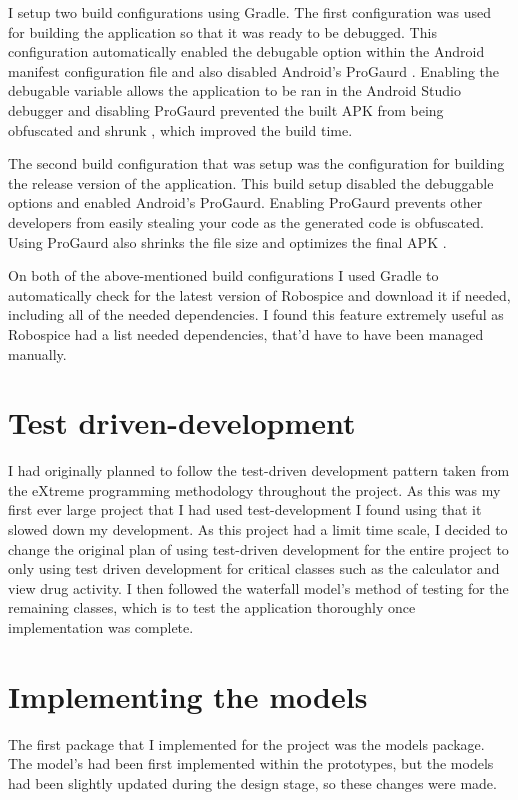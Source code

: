 I setup two build configurations using Gradle. The first configuration was used for building the application so that it was ready to be debugged. This configuration automatically enabled the debugable option within the Android manifest configuration file and also disabled Android’s ProGaurd \cite{progaurd}. Enabling the debugable variable allows the application to be ran in the Android Studio debugger and disabling ProGaurd prevented the built APK from being obfuscated and shrunk \cite{progaurd}, which improved the build time. 

The second build configuration that was setup was the configuration for building the release version of the application. This build setup disabled the debuggable options and enabled Android’s ProGaurd. Enabling ProGaurd prevents other developers from easily stealing your code as the generated code is obfuscated. Using ProGaurd also shrinks the file size and optimizes the final APK \cite{progaurd}.

On both of the above-mentioned build configurations I used Gradle to automatically check for the latest version of Robospice and download it if needed, including all of the needed dependencies. I found this feature extremely useful as Robospice had a list needed dependencies, that’d have to have been managed manually. 

\section{Test driven-development}

I had originally planned to follow the test-driven development pattern \cite{tdd} taken from the eXtreme programming \cite{xp} methodology throughout the project. As this was my first ever large project that I had used test-development I found using that it slowed down my development. As this project had a limit time scale, I decided to change the original plan of using test-driven development for the entire project to only using test driven development for critical classes such as the calculator and view drug activity. I then followed the waterfall model’s method of testing for the remaining classes, which is to test the application thoroughly once implementation was complete.

\section{Implementing the models}

The first package that I implemented for the project was the models package. The model’s had been first implemented within the prototypes, but the models had been slightly updated during the design stage, so these changes were made.

